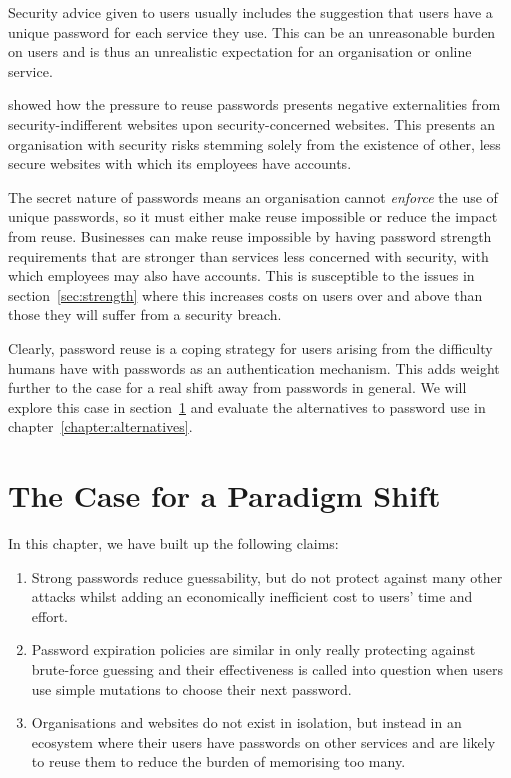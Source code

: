 \documentclass{report}
\begin{document}
Security advice given to users usually includes the suggestion that users
have a unique password for each service they use. This can
be an unreasonable burden on users\parencite{florencio2014password}
and is thus an unrealistic expectation for an organisation or online
service.

\textcite{preibusch2010password} showed how the pressure to reuse passwords
presents negative externalities from security-indifferent websites upon
security-concerned websites. This presents an organisation with
security risks stemming solely from the existence of other, less
secure websites with which its employees have accounts.

The secret nature of passwords means an organisation cannot \emph{enforce}
the use of unique passwords, so it must either make reuse impossible or
reduce the impact from reuse. Businesses can make reuse impossible
by having password strength requirements that are stronger than
services less concerned with security, with which employees may also have
accounts. This is susceptible to the issues in section~\ref{sec:strength}
where this increases costs on users over and above than those they will
suffer from a security breach.

Clearly, password reuse is a coping strategy for users arising from the
difficulty humans have with passwords as an authentication mechanism. This
adds weight further to the case for a real shift away from passwords in
general. We will explore this case in section~\ref{sec:case} and evaluate
the alternatives to password use in chapter~\ref{chapter:alternatives}.

\section{The Case for a Paradigm Shift}
\label{sec:case}

In this chapter, we have built up the following claims:

\begin{enumerate}
  \item Strong passwords reduce guessability, but do not protect against
    many other attacks whilst adding an economically inefficient cost to users'
    time and effort.
  \item Password expiration policies are similar in only really protecting against
    brute-force guessing and their effectiveness is called into question when
    users use simple mutations to choose their next password.
  \item Organisations and websites do not exist in isolation, but instead in
    an ecosystem where their users have passwords on other services and are likely
    to reuse them to reduce the burden of memorising too many.
\end{enumerate}
\end{document}
